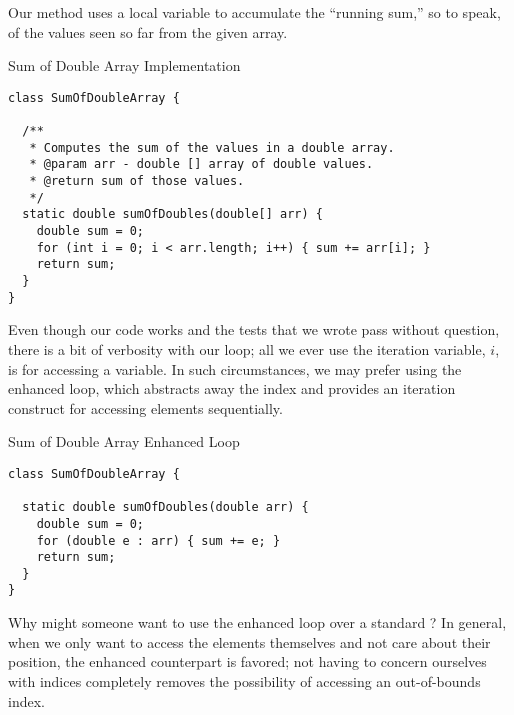 Our method uses a local variable to accumulate the ``running sum,'' so to speak, of the values seen so far from the given array.

\begin{cl}[]{Sum of Double Array Implementation}
\begin{lstlisting}[language=MyJava]
class SumOfDoubleArray {

  /**
   * Computes the sum of the values in a double array.
   * @param arr - double [] array of double values.
   * @return sum of those values.
   */
  static double sumOfDoubles(double[] arr) {
    double sum = 0;
    for (int i = 0; i < arr.length; i++) { sum += arr[i]; }
    return sum;
  }
}
\end{lstlisting}
\end{cl}

Even though our code works and the tests that we wrote pass without question, there is a bit of verbosity with our loop; all we ever use the iteration variable, $i$, is for accessing a variable. In such circumstances, we may prefer using the enhanced  loop, which abstracts away the index and provides an iteration construct for accessing elements sequentially.

\begin{cl}[]{Sum of Double Array Enhanced  Loop}
\begin{lstlisting}[language=MyJava]
class SumOfDoubleArray {

  static double sumOfDoubles(double arr) {
    double sum = 0;
    for (double e : arr) { sum += e; }
    return sum;
  }
}
\end{lstlisting}
\end{cl}

Why might someone want to use the enhanced  loop over a standard ? In general, when we only want to access the elements themselves and not care about their position, the enhanced counterpart is favored; not having to concern ourselves with indices completely removes the possibility of accessing an out-of-bounds index. 


